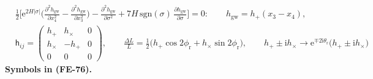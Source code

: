\documentclass[
  10pt,
]{article}
\begin{document}
\[
\begin{aligned}
&\frac12\Big[\mathrm{e}^{2H\lvert\sigma\rvert}\Big(\frac{\partial^2h_{\mathrm{gw}}}{\partial x_4^2} - \frac{\partial^2h_{\mathrm{gw}}}{\partial x_3^2}\Big)
 - \frac{\partial^2h_{\mathrm{gw}}}{\partial\sigma^2} + 7H\,\mathrm{sgn}(\sigma)\,\frac{\partial h_{\mathrm{gw}}}{\partial\sigma}\Big] = 0:\qquad
 h_{\mathrm{gw}} = h_{+}(x_3 - x_4),\\
&\mathsf{h}_{ij} = \begin{pmatrix} h_{+} & h_{\times} & 0\\ h_{\times} & -h_{+} & 0\\ 0 & 0 & 0\end{pmatrix},\qquad
 \frac{\Delta L}{L} = \frac12\big(h_{+}\cos2\phi_{\mathrm{r}} + h_{\times}\sin2\phi_{\mathrm{r}}\big),\qquad
 h_{+} \pm \mathrm{i}h_{\times} \to \mathrm{e}^{\mp2\mathrm{i}\theta_{\mathrm{r}}}\big(h_{+} \pm \mathrm{i}h_{\times}\big)
\end{aligned} \tag{FE-76}
\] \textbf{Symbols in (FE-76).}
\end{document}
